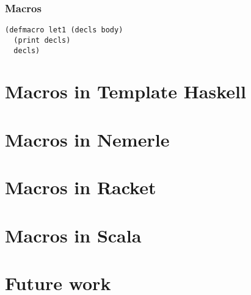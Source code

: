 \documentclass[hyperref={bookmarks=false}]{beamer}
\begin{document}
\begin{frame}[fragile]
\frametitle{Macros}
\begin{lstlisting}
(defmacro let1 (decls body)
  (print decls)
  decls)
\end{lstlisting}
\end{frame}

\section{Macros in Template Haskell}

\section{Macros in Nemerle}

\section{Macros in Racket}

\section{Macros in Scala}

\section{Future work}
\end{document}
